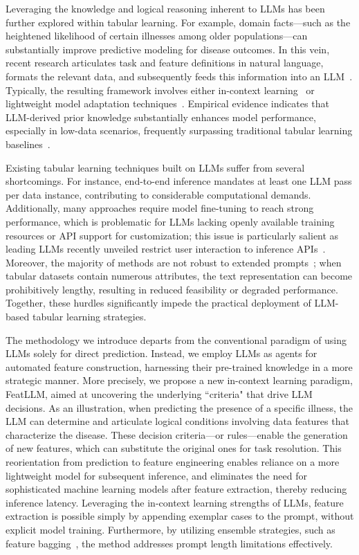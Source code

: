 Leveraging the knowledge and logical reasoning inherent to LLMs has been further explored within tabular learning. For example, domain facts—such as the heightened likelihood of certain illnesses among older populations—can substantially improve predictive modeling for disease outcomes. In this vein, recent research articulates task and feature definitions in natural language, formats the relevant data, and subsequently feeds this information into an LLM~\cite{dinh2022lift,wang2023anypredict}. Typically, the resulting framework involves either in-context learning~\cite{nam2023semi} or lightweight model adaptation techniques~\cite{dinh2022lift,hegselmann2023tabllm}. Empirical evidence indicates that LLM-derived prior knowledge substantially enhances model performance, especially in low-data scenarios, frequently surpassing traditional tabular learning baselines~\cite{hegselmann2023tabllm}.

Existing tabular learning techniques built on LLMs suffer from several shortcomings. For instance, end-to-end inference mandates at least one LLM pass per data instance, contributing to considerable computational demands. Additionally, many approaches require model fine-tuning to reach strong performance, which is problematic for LLMs lacking openly available training resources or API support for customization; this issue is particularly salient as leading LLMs recently unveiled restrict user interaction to inference APIs~\cite{anil2023palm,openai2023gpt4}. Moreover, the majority of methods are not robust to extended prompts~\cite{liu2023lost}; when tabular datasets contain numerous attributes, the text representation can become prohibitively lengthy, resulting in reduced feasibility or degraded performance. Together, these hurdles significantly impede the practical deployment of LLM-based tabular learning strategies.

The methodology we introduce departs from the conventional paradigm of using LLMs solely for direct prediction. Instead, we employ LLMs as agents for automated feature construction, harnessing their pre-trained knowledge in a more strategic manner. More precisely, we propose a new in-context learning paradigm, \textsf{FeatLLM}, aimed at uncovering the underlying ``criteria" that drive LLM decisions. As an illustration, when predicting the presence of a specific illness, the LLM can determine and articulate logical conditions involving data features that characterize the disease. These decision criteria—or rules—enable the generation of new features, which can substitute the original ones for task resolution. This reorientation from prediction to feature engineering enables reliance on a more lightweight model for subsequent inference, and eliminates the need for sophisticated machine learning models after feature extraction, thereby reducing inference latency. Leveraging the in-context learning strengths of LLMs, feature extraction is possible simply by appending exemplar cases to the prompt, without explicit model training. Furthermore, by utilizing ensemble strategies, such as feature bagging~\cite{breiman2001random}, the method addresses prompt length limitations effectively.

